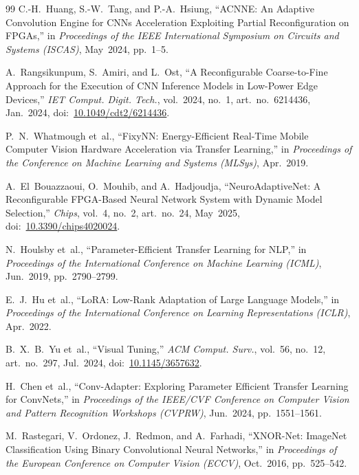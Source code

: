 \documentclass[journal]{IEEEtran}
\begin{document}
\begin{thebibliography}{99}
C.-H.~Huang, S.-W.~Tang, and P.-A.~Hsiung,
``ACNNE: An Adaptive Convolution Engine for CNNs Acceleration Exploiting Partial Reconfiguration on FPGAs,''
in \emph{Proceedings of the IEEE International Symposium on Circuits and Systems (ISCAS)}, May~2024, pp.~1--5.

A.~Rangsikunpum, S.~Amiri, and L.~Ost,
``A Reconfigurable Coarse-to-Fine Approach for the Execution of CNN Inference Models in Low-Power Edge Devices,''
\emph{IET Comput. Digit. Tech.}, vol.~2024, no.~1, art.~no.~6214436, Jan.~2024,
doi:~\url{10.1049/cdt2/6214436}.

P.~N.~Whatmough et~al.,
``FixyNN: Energy-Efficient Real-Time Mobile Computer Vision Hardware Acceleration via Transfer Learning,''
in \emph{Proceedings of the Conference on Machine Learning and Systems (MLSys)}, Apr.~2019.

A.~El~Bouazzaoui, O.~Mouhib, and A.~Hadjoudja,
``NeuroAdaptiveNet: A Reconfigurable FPGA-Based Neural Network System with Dynamic Model Selection,''
\emph{Chips}, vol.~4, no.~2, art.~no.~24, May~2025,
doi:~\url{10.3390/chips4020024}.

N.~Houlsby et~al.,
``Parameter-Efficient Transfer Learning for NLP,''
in \emph{Proceedings of the International Conference on Machine Learning (ICML)}, Jun.~2019, pp.~2790--2799.


E.~J.~Hu et~al.,
``LoRA: Low-Rank Adaptation of Large Language Models,''
in \emph{Proceedings of the International Conference on Learning Representations (ICLR)}, Apr.~2022.


B.~X.~B.~Yu et~al.,
``Visual Tuning,''
\emph{ACM Comput. Surv.}, vol.~56, no.~12, art.~no.~297, Jul.~2024,
doi:~\url{10.1145/3657632}.

H.~Chen et~al.,
``Conv-Adapter: Exploring Parameter Efficient Transfer Learning for ConvNets,''
in \emph{Proceedings of the IEEE/CVF Conference on Computer Vision and Pattern Recognition Workshops (CVPRW)}, Jun.~2024, pp.~1551--1561.

M.~Rastegari, V.~Ordonez, J.~Redmon, and A.~Farhadi,
``XNOR-Net: ImageNet Classification Using Binary Convolutional Neural Networks,''
in \emph{Proceedings of the European Conference on Computer Vision (ECCV)}, Oct.~2016, pp.~525--542.


\end{thebibliography}
\end{document}
